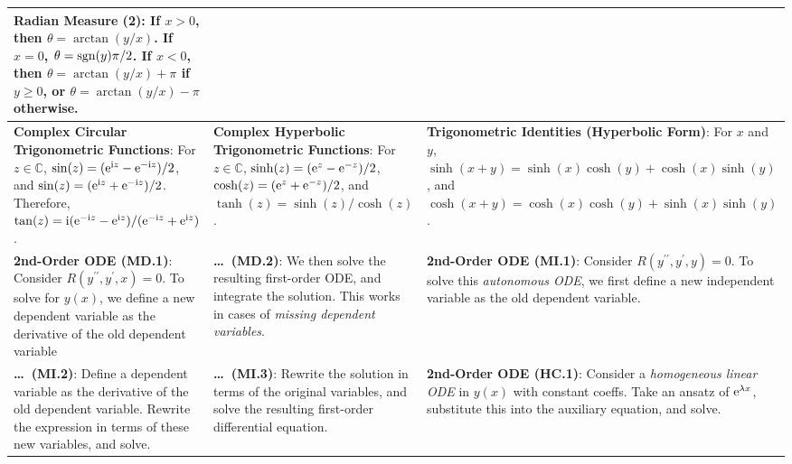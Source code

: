 \begin{tabular}{|m{.31\linewidth}|m{.31\linewidth}|m{.31\linewidth}|}
\textbf{Radian Measure (2)}: If $x>0$, then $\theta=\arctan(y/x)$. If $x=0$,
$\theta=\operatorname{sgn}(y)\pi/2$. If $x<0$, then $\theta=\arctan(y/x) + \pi$ if $y\geq 0$,
or $\theta=\arctan(y/x)-\pi$ otherwise. \\

\hline

\textbf{Complex Circular Trigonometric Functions}: For $z\in\mathbb{C}$,
$\sin(z)=(\mathrm{e}^{\mathrm{i}z}- \mathrm{e}^{-\mathrm{i}z})/2$,
and $\sin(z)=(\mathconst{e}%
^{\mathconst{i}z}+\mathconst{e}^{-\mathconst{i}z})/2$. Therefore,
$\tan(z)=\mathconst{i}(\mathconst{e}^{-\mathconst{i}z}-\mathconst{e}%
^{\mathconst{i}z})/(\mathconst{e}^{-\mathconst{i}z}+\mathconst{e}%
^{\mathconst{i}z})$. &

\textbf{Complex Hyperbolic Trigonometric Functions}: For $z\in\mathbb{C}$,
$\sinh(z)=(\mathrm{e}^z-\mathrm{e}^{-z})/2$,
$\cosh(z)=(\mathrm{e}^z+\mathrm{e}^{-z})/2$, and
$\tanh(z)=\sinh(z)/\cosh(z)$. &

\textbf{Trigonometric Identities (Hyperbolic Form)}: For $x$ and $y$,
$\sinh(x+y)=\sinh(x)\cosh(y) + \cosh(x)\sinh(y)$, and
$\cosh(x+y)=\cosh(x)\cosh(y) + \sinh(x)\sinh(y)$. \\

\hline
\textbf{2nd-Order ODE (MD.1)}: Consider $R(y^{\prime\prime},y^\prime,x)=0$. To
solve for $y(x)$, we define a new dependent variable as the derivative of the
old dependent variable &

\textbf{\ldots\ (MD.2)}: We then solve the resulting first-order ODE, and
integrate the solution. This works in cases of \emph{missing dependent
variables}. &

\textbf{2nd-Order ODE (MI.1)}: Consider $R(y^{\prime\prime},y^\prime,y)=0$. To
solve this \emph{autonomous ODE}, we first define a new independent variable as
the old dependent variable. \\

\hline

\textbf{\ldots\ (MI.2)}: Define a dependent variable as the derivative of the
old dependent variable. Rewrite the expression in terms of these new variables,
and solve. &

\textbf{\ldots\ (MI.3)}: Rewrite the solution in terms of the original
variables, and solve the resulting first-order differential equation. &

\textbf{2nd-Order ODE (HC.1)}: Consider a \emph{homogeneous linear ODE} in
$y(x)$ with constant coeffs. Take an ansatz of $\mathrm{e}^{\lambda x}$,
substitute this into the auxiliary equation, and solve. \\


\end{tabular}
